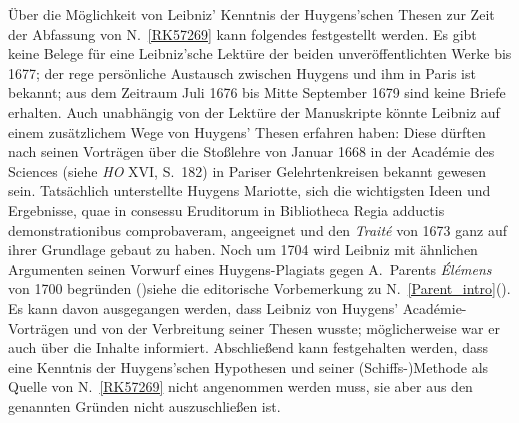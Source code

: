 \begin{ledgroup}
%
\pend
%
\pstart
Über die Möglichkeit von Leibniz' Kenntnis der Huygens'schen Thesen zur Zeit der Abfassung 
%
von N.~\ref{RK57269} kann folgendes festgestellt werden.
%
Es gibt keine Belege für eine Leibniz'sche Lektüre der beiden unveröffentlichten Werke bis 1677;
%
der rege persönliche Austausch zwischen \protect{}Huygens und ihm in Paris\protect{} ist bekannt;
%
aus dem Zeitraum Juli 1676 bis Mitte September 1679 sind keine Briefe erhalten.
%
Auch unabhängig von der Lektüre der Manuskripte könnte Leibniz auf einem zusätzlichem Wege
%
von \protect{}Huygens' Thesen erfahren haben: Diese dürften nach seinen Vorträgen über die Stoßlehre 
%
von Januar 1668 in der Académie des Sciences  (siehe \textit{HO} XVI, S.~182)
%
in Pariser Gelehrtenkreisen bekannt gewesen sein.
%
Tatsächlich unterstellte \protect{}Huygens \protect{}Mariotte, 
%
sich die wichtigsten Ideen und Ergebnisse, \glqq quae in consessu Eruditorum in Bibliotheca Regia adductis demonstrationibus comprobaveram\grqq,
%
angeeignet und den \textit{Traité} von 1673 ganz auf ihrer Grundlage gebaut zu haben.
%
Noch um 1704 wird Leibniz mit ähnlichen Argumenten seinen Vorwurf eines Huygens-Plagiats gegen 
%
\protect{}A.~Parents \cite{01500}\textit{Élémens} von 1700
%
begründen (\protect\vphantom)siehe die editorische Vorbemerkung zu N.~\ref{Parent_intro}\protect\vphantom().
%
Es kann davon ausgegangen werden, dass Leibniz von \protect{}Huygens' Académie-Vorträgen und von der Verbreitung seiner Thesen wusste;
%
möglicherweise war er auch über die Inhalte informiert.
%
Abschließend kann festgehalten werden, dass eine Kenntnis der \protect{}Huygens'schen Hypothesen und seiner (Schiffs-)Methode
%
als Quelle von N.~\ref{RK57269} nicht angenommen werden muss, 
%
sie aber aus den genannten Gründen nicht auszuschließen ist.
%
\pend
%
\end{ledgroup}
